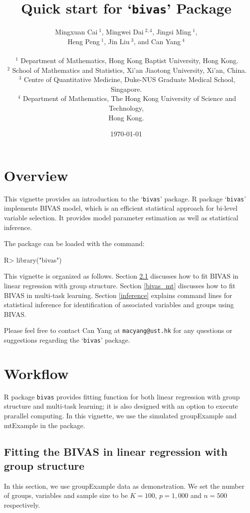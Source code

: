 \documentclass[11pt]{article}
\title{Quick start for `\texttt{bivas}' Package}
\author{Mingxuan Cai$~^1$, Mingwei Dai$~^{2,4}$, Jingsi Ming$~^1$, \\
Heng Peng$~^1$, Jin Liu$~^3$, and Can Yang$~^4$\\
\\
$~^1$ Department of Mathematics, Hong Kong Baptist University, Hong Kong.\\
$~^2$ School of Mathematics and Statistics, Xi'an Jiaotong University, Xi'an, China.\\
$~^3$ Centre of Quantitative Medicine, Duke-NUS Graduate Medical School, Singapore.\\
$~^4$ Department of Mathematics, The Hong Kong University of Science and Technology,\\
Hong Kong.\\
}
\date{\today}
\begin{document}

\maketitle

\section{Overview}

This vignette provides an introduction to the `\texttt{bivas}' package.
R package `\texttt{bivas}' implements BIVAS model,
which is an efficient statistical approach for bi-level variable selection. It provides model parameter estimation as well as statistical inference.

The package can be loaded with the command:


\begin{Schunk}
\begin{Sinput}
R> library("bivas")
\end{Sinput}
\end{Schunk}

This vignette is organized as follows.
Section \ref{bivas} discusses how to fit BIVAS in linear regression with group structure.
Section \ref{bivas_mt} discusses how to fit BIVAS in multi-task learning.
Section \ref{inference} explains command lines for statistical inference for identification of associated variables and groups using BIVAS.


Please feel free to contact Can Yang at \texttt{macyang@ust.hk} for any questions or suggestions regarding the `\texttt{bivas}' package.

\section{Workflow}\label{workflow}

R package \texttt{bivas} provides fitting function for both linear regression with group structure and multi-task learning;
it is also designed with an option to execute prarallel computing. In this vignette, we use the simulated groupExample and mtExample in the package.

\subsection{Fitting the BIVAS in linear regression with group structure}\label{bivas}

In this section, we use groupExample data as demonstration. We set the number of groups, variables and sample size to be $K=100$, $p=1,000$ and $n=500$ respectively.
\end{document}
